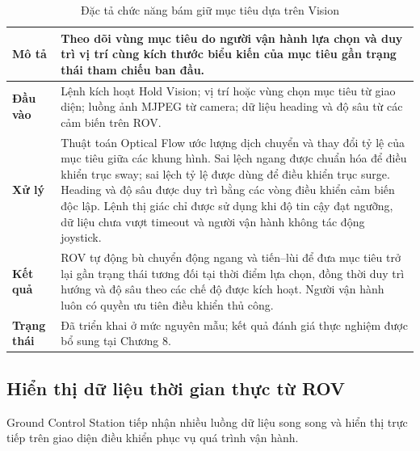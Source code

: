 \documentclass[../DoAn.tex]{subfiles}
\begin{document}
\begin{table}[H]
\centering
\renewcommand{\arraystretch}{1.3}
\begin{tabular}{|l|p{10.5cm}|}
\hline
\textbf{Mô tả} & 
Theo dõi vùng mục tiêu do người vận hành lựa chọn và duy trì vị trí cùng kích thước biểu kiến của mục tiêu gần trạng thái tham chiếu ban đầu. \\
\hline
\textbf{Đầu vào} & 
Lệnh kích hoạt Hold Vision; vị trí hoặc vùng chọn mục tiêu từ giao diện; luồng ảnh MJPEG từ camera; dữ liệu heading và độ sâu từ các cảm biến trên ROV. \\
\hline
\textbf{Xử lý} & 
Thuật toán Optical Flow ước lượng dịch chuyển và thay đổi tỷ lệ của mục tiêu giữa các khung hình. Sai lệch ngang được chuẩn hóa để điều khiển trục sway; sai lệch tỷ lệ được dùng để điều khiển trục surge. Heading và độ sâu được duy trì bằng các vòng điều khiển cảm biến độc lập. Lệnh thị giác chỉ được sử dụng khi độ tin cậy đạt ngưỡng, dữ liệu chưa vượt timeout và người vận hành không tác động joystick. \\
\hline
\textbf{Kết quả} & 
ROV tự động bù chuyển động ngang và tiến--lùi để đưa mục tiêu trở lại gần trạng thái tương đối tại thời điểm lựa chọn, đồng thời duy trì hướng và độ sâu theo các chế độ được kích hoạt. Người vận hành luôn có quyền ưu tiên điều khiển thủ công. \\
\hline
\textbf{Trạng thái} & 
Đã triển khai ở mức nguyên mẫu; kết quả đánh giá thực nghiệm được bổ sung tại Chương 8. \\
\hline
\end{tabular}
\caption{Đặc tả chức năng bám giữ mục tiêu dựa trên Vision}
\label{tab:hold_vision}
\end{table}

\subsection{Hiển thị dữ liệu thời gian thực từ ROV}

Ground Control Station tiếp nhận nhiều luồng dữ liệu song song và hiển
thị trực tiếp trên giao diện điều khiển phục vụ quá trình vận hành.
\end{document}
